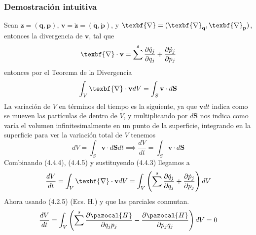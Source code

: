 \subsubsection{Demostración intuitiva}
Sean $\mathbf{z}=(\mathbf{q},\mathbf{p})$, $\mathbf{v}=\dot{\mathbf{z}}=(\dot{\mathbf{q}},\dot{\mathbf{p}})$, y $\texbf{\nabla} = (\texbf{\nabla}_\textbf{q},\texbf{\nabla}_\textbf{p})$, entonces la divergencia de $\mathbf{v}$, tal que
\begin{equation} \label{4.4.3}
    \texbf{\nabla} \cdot \mathbf{v} = \sum^s \frac{\partial \dot{q}_j}{\partial q_j} + \frac{\partial \dot{p}_j}{\partial p_j}
\end{equation} 
entonces por el Teorema de la Divergencia
\begin{equation} \label{4.4.4}
    \int_V{\texbf{\nabla} \cdot \mathbf{v} dV} = \int_S \mathbf{v} \cdot d\mathbf{S}
\end{equation} 
La variación de $V$ en términos del tiempo es la siguiente, ya que $\mathbf{v}dt$ indica como se mueven las partículas de dentro de $V$, y multiplicando por $d\mathbf{S}$ nos indica como varía el volumen infinitesimalmente en un punto de la superficie, integrando en la superficie para ver la variación total de $V$ tenemos
\begin{equation} \label{4.4.5}
    dV=\int_S \mathbf{v} \cdot d\mathbf{S} dt \implies \frac{dV}{dt} = \int_S \mathbf{v} \cdot d\mathbf{S}
\end{equation} 
Combinando (4.4.4), (4.4.5) y sustituyendo (4.4.3) llegamos a 
\begin{equation} \label{4.4.5}
    \frac{dV}{dt} = \int_V{\texbf{\nabla} \cdot \mathbf{v} dV} = \int_V{\left(\sum^s \frac{\partial \dot{q}_j}{\partial q_j} + \frac{\partial \dot{p}_j}{\partial p_j}\right)dV}
\end{equation} 
Ahora usando (4.2.5) (Ecs. H.) y que las parciales conmutan.
\begin{equation} \label{4.4.5}
    \frac{dV}{dt} = \int_V{\left(\sum^s \frac{\partial \pazocal{H}}{\partial q_j p_j} - \frac{\partial \pazocal{H}}{\partial p_j q_j}\right)dV} = 0
\end{equation} 